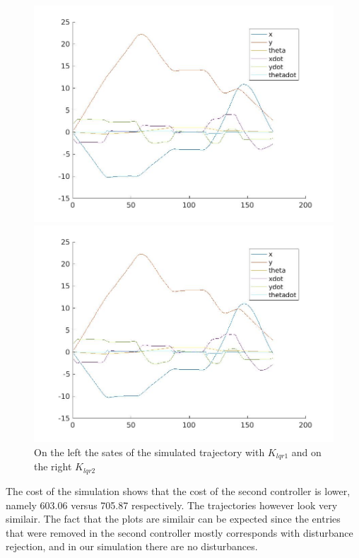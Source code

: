 \documentclass[•]{article}
\begin{document}
\begin{figure}[H]
\begin{minipage}{.45\textwidth}
\includegraphics[width = \textwidth]{lqr1states.jpg}
\end{minipage}
\begin{minipage}{.45\textwidth}
\includegraphics[width = \textwidth]{lqr2states.jpg}
\end{minipage}
\caption{On the left the sates of the simulated trajectory with $K_{lqr1}$ and on the right $K_{lqr2}$ }
\end{figure}

The cost of the simulation shows that the cost of the second controller is lower, namely 603.06 versus 705.87 respectively. The trajectories however look very similair. The fact that the plots are similair can be expected since the entries that were removed in the second controller mostly corresponds with disturbance rejection, and in our simulation there are no disturbances. 
\end{document}
